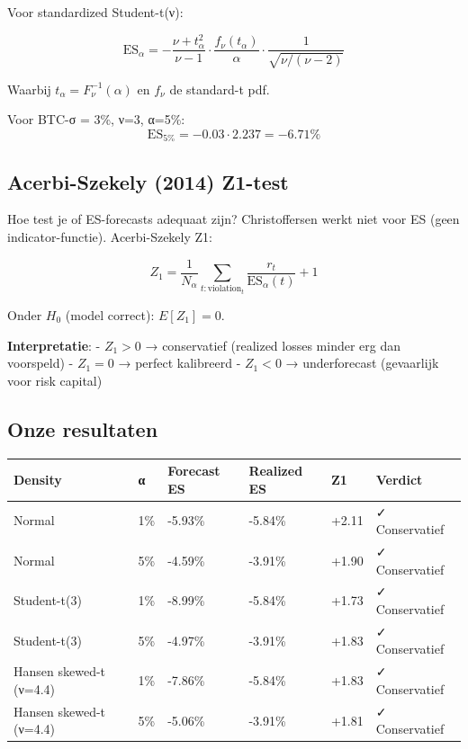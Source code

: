 \documentclass[11pt,a4paper]{article}
\begin{document}
Voor standardized Student-t(ν):

\[\text{ES}_\alpha = -\frac{\nu + t_\alpha^2}{\nu - 1} \cdot \frac{f_\nu(t_\alpha)}{\alpha} \cdot \frac{1}{\sqrt{\nu/(\nu-2)}}\]

Waarbij \(t_\alpha = F^{-1}_\nu(\alpha)\) en \(f_\nu\) de standard-t pdf.

Voor BTC-σ = 3\%, ν=3, α=5\%:
\[\text{ES}_{5\%} = -0.03 \cdot 2.237 = -6.71\%\]

\hypertarget{acerbi-szekely-2014-z1-test}{%
\subsection{Acerbi-Szekely (2014) Z1-test}\label{acerbi-szekely-2014-z1-test}}

Hoe test je of ES-forecasts adequaat zijn? Christoffersen werkt niet voor ES (geen indicator-functie). Acerbi-Szekely Z1:

\[Z_1 = \frac{1}{N_\alpha} \sum_{t: \text{violation}_t} \frac{r_t}{\text{ES}_\alpha(t)} + 1\]

Onder \(H_0\) (model correct): \(E[Z_1] = 0\).

\textbf{Interpretatie}:
- \(Z_1 > 0\) → conservatief (realized losses minder erg dan voorspeld)
- \(Z_1 = 0\) → perfect kalibreerd
- \(Z_1 < 0\) → underforecast (gevaarlijk voor risk capital)

\hypertarget{onze-resultaten-1}{%
\subsection{Onze resultaten}\label{onze-resultaten-1}}

\begin{longtable}[]{@{}llllll@{}}
\toprule
Density & α & Forecast ES & Realized ES & Z1 & Verdict \\
\midrule
\endhead
Normal & 1\% & -5.93\% & -5.84\% & +2.11 & ✓ Conservatief \\
Normal & 5\% & -4.59\% & -3.91\% & +1.90 & ✓ Conservatief \\
Student-t(3) & 1\% & -8.99\% & -5.84\% & +1.73 & ✓ Conservatief \\
Student-t(3) & 5\% & -4.97\% & -3.91\% & +1.83 & ✓ Conservatief \\
Hansen skewed-t (ν=4.4) & 1\% & -7.86\% & -5.84\% & +1.83 & ✓ Conservatief \\
Hansen skewed-t (ν=4.4) & 5\% & -5.06\% & -3.91\% & +1.81 & ✓ Conservatief \\
\bottomrule
\end{longtable}
\end{document}
